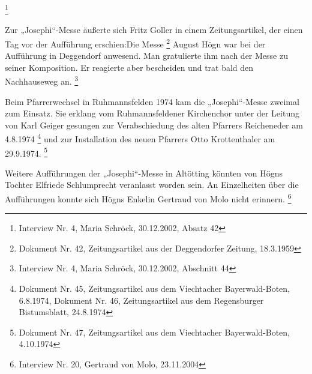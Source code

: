 \begin{figure}
\img{}
\caption{}
\end{figure}





\footnote{
Interview Nr. 4, Maria Schröck, 30.12.2002, Absatz 42}

Zur „Josephi“-Messe äußerte sich Fritz Goller in einem Zeitungsartikel,
der einen Tag vor der Aufführung erschien:\zitat{ }Die
Messe \footnote{Dokument
Nr. 42, Zeitungsartikel aus der Deggendorfer Zeitung, 18.3.1959} August
Högn war bei der Aufführung in Deggendorf anwesend. Man gratulierte ihm
nach der Messe zu seiner Komposition. Er reagierte aber bescheiden und
trat bald den Nachhauseweg an. \footnote{Interview Nr. 4, Maria
Schröck, 30.12.2002, Abschnitt 44}

Beim Pfarrerwechsel in Ruhmannsfelden 1974 kam die „Josephi“-Messe
zweimal zum Einsatz. Sie erklang vom Ruhmannsfeldener Kirchenchor unter
der Leitung von Karl Geiger gesungen zur Verabschiedung des alten
Pfarrers Reicheneder am 4.8.1974 \footnote{Dokument Nr. 45,
Zeitungsartikel aus dem Viechtacher Bayerwald-Boten, 6.8.1974, Dokument
Nr. 46, Zeitungsartikel aus dem Regensburger Bistumsblatt, 24.8.1974}
und zur Installation des neuen Pfarrers Otto Krottenthaler am
29.9.1974. \footnote{Dokument Nr. 47, Zeitungsartikel aus dem
Viechtacher Bayerwald-Boten, 4.10.1974}

Weitere Aufführungen der „Josephi“-Messe in Altötting könnten von Högns
Tochter Elfriede Schlumprecht veranlasst worden sein. An Einzelheiten
über die Aufführungen konnte sich Högns Enkelin Gertraud von Molo nicht
erinnern. \footnote{Interview Nr. 20, Gertraud von Molo, 23.11.2004}


